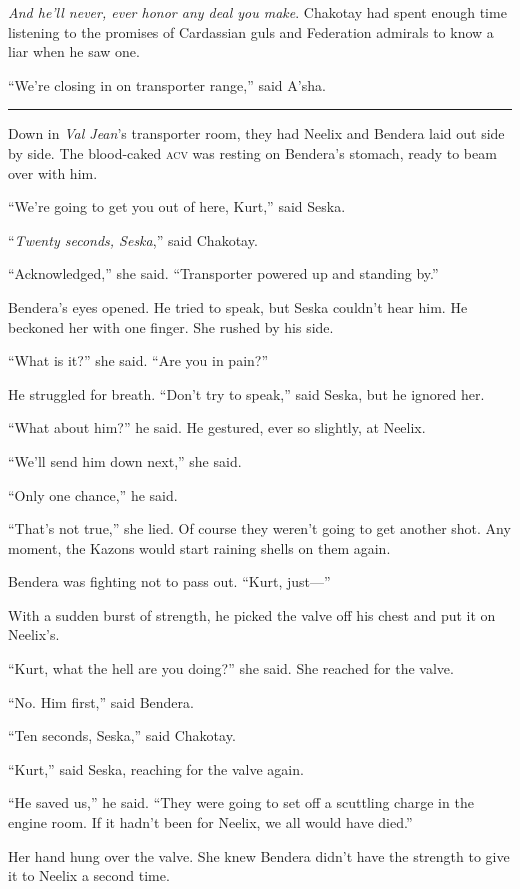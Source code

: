 \documentclass[twoside,letterpaper,12pt]{memoir}
\begin{document}
\textit{And he'll never, ever honor any deal you make}. Chakotay had spent enough time listening to the promises of Cardassian guls and Federation admirals to know a liar when he saw one.

``We're closing in on transporter range,'' said A'sha.

\fancybreak{\rule{3cm}{0.4 pt}}
Down in \textit{Val Jean}'s transporter room, they had Neelix and Bendera laid out side by side. The blood-caked \textsc{acv} was resting on Bendera's stomach, ready to beam over with him.

``We're going to get you out of here, Kurt,'' said Seska.

``\textit{Twenty seconds, Seska},'' said Chakotay.

``Acknowledged,'' she said. ``Transporter powered up and standing by.''

Bendera's eyes opened. He tried to speak, but Seska couldn't hear him. He beckoned her with one finger. She rushed by his side.

``What is it?'' she said. ``Are you in pain?''

He struggled for breath. ``Don't try to speak,'' said Seska, but he ignored her.

``What about him?'' he said. He gestured, ever so slightly, at Neelix.

``We'll send him down next,'' she said.

``Only one chance,'' he said.

``That's not true,'' she lied. Of course they weren't going to get another shot. Any moment, the Kazons would start raining shells on them again.

Bendera was fighting not to pass out. ``Kurt, just---''

With a sudden burst of strength, he picked the valve off his chest and put it on Neelix's.

``Kurt, what the hell are you doing?'' she said. She reached for the valve.

``No. Him first,'' said Bendera.

``Ten seconds, Seska,'' said Chakotay.

``Kurt,'' said Seska, reaching for the valve again.

``He saved us,'' he said. ``They were going to set off a scuttling charge in the engine room. If it hadn't been for Neelix, we all would have died.''

Her hand hung over the valve. She knew Bendera didn’t have the strength to give it to Neelix a second time.
\end{document}
